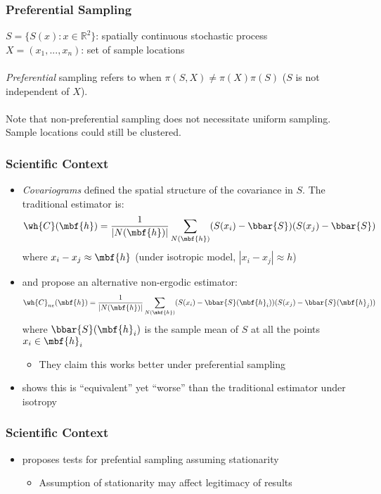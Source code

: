 \documentclass[xcolor=svgnames]{beamer}
\begin{document}
\begin{frame}
\frametitle{Preferential Sampling}
$S = \{S(x) : x \in \mathbb{R}^2\}$: spatially continuous stochastic process \\
$X = (x_1, ..., x_n)$: set of sample locations
~\\~\\
\emph{Preferential} sampling refers to when $\pi(S, X) \neq \pi(X) \pi(S)$ ($S$ is not independent of $X$).
~\\~\\
Note that non-preferential sampling does not necessitate uniform sampling.  Sample locations could still be clustered.
\end{frame}
\begin{frame}
\frametitle{Scientific Context}

\begin{itemize}
\item \emph{Covariograms} defined the spatial structure of the covariance in $S$.  The traditional estimator is:
$$ \wh{C}(\mbf{h}) = \frac{1}{| N(\mbf{h})|} \sum_{N(\mbf{h})} (S(x_i) - \bbar{S})(S(x_j) - \bbar{S}) $$
where $x_i - x_j \approx \mbf{h}$ (under isotropic model, $|x_i - x_j| \approx h$)
\item \citealt{isaaks1988} and \citealt{srivastava1989} propose an alternative non-ergodic estimator:
$$ \wh{C}_{ne}(\mbf{h}) = \frac{1}{| N(\mbf{h})|} \sum_{N(\mbf{h})} (S(x_i) - \bbar{S}(\mbf{h}_i))(S(x_j) - \bbar{S}(\mbf{h}_j)) $$
where $\bbar{S}(\mbf{h}_i)$ is the sample mean of $S$ at all the points $x_i \in \mbf{h}_i$
\begin{itemize}
\item They claim this works better under preferential sampling
\end{itemize}
\item \citealt{curriero2002} shows this is ``equivalent'' yet ``worse'' than the traditional estimator under isotropy
\end{itemize}

\end{frame}
\begin{frame}
\frametitle{Scientific Context}

\begin{itemize}
\item \citealt{schlather2004} proposes tests for prefential sampling assuming stationarity
\begin{itemize}
\item Assumption of stationarity may affect legitimacy of results
\end{itemize}
\end{itemize}

\end{frame}
\end{document}
